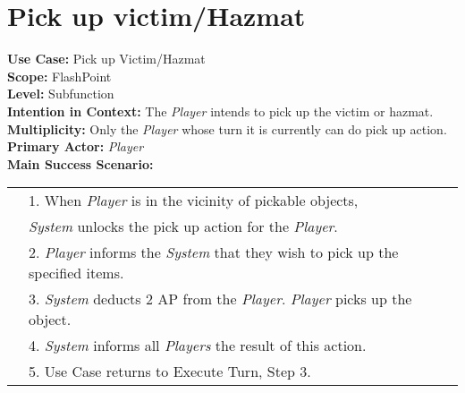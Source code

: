 \documentclass{article}
\begin{document}
	\section*{Pick up victim/Hazmat}
	\textbf{Use Case:} Pick up Victim/Hazmat\\
	\textbf{Scope:} FlashPoint\\
	\textbf{Level:} Subfunction\\
	\textbf{Intention in Context:} The \textit{Player} intends to pick up the victim or hazmat.\\
	\textbf{Multiplicity:} Only the \textit{Player} whose turn it is currently can do pick up action.\\
	\textbf{Primary Actor:} \textit{Player}\\
	\textbf{Main Success Scenario:}\\
	\begin{tabular}{l l}
		&1. When \textit{Player} is in the vicinity of pickable objects,\\
		&\qquad\textit{System} unlocks the pick up action for the \textit{Player}.\\
		&2. \textit{Player} informs the \textit{System} that they wish to pick up the specified items.\\
		&3. \textit{System} deducts 2 AP from the \textit{Player}. \textit{Player} picks up the object.\\
		&4. \textit{System} informs all \textit{Players} the result of this action.\\
		&5. Use Case returns to Execute Turn, Step 3.
	\end{tabular}
\end{document}
